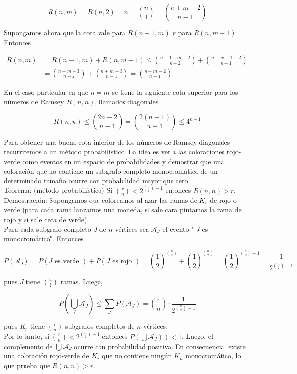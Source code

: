 \documentclass[10pt]{article}
\begin{document}
$$
R(n, m)=R(n, 2)=n=\binom{n}{1}=\binom{n+m-2}{n-1}
$$

Supongamos ahora que la cota vale para $R(n-1, m)$ y para $R(n, m-1)$. Entonces

$$
\begin{aligned}
R(n, m) & =R(n-1, m)+R(n, m-1) \leq\binom{ n-1+m-2}{n-2}+\binom{n+m-1-2}{n-1}= \\
& =\binom{n+m-3}{n-2}+\binom{n+m-3}{n-1}=\binom{n+m-2}{n-1}
\end{aligned}
$$

En el caso particular en que $n=m$ se tiene la siguiente cota superior para los números de Ramsey $R(n, n)$, llamados diagonales

$$
R(n, n) \leq\binom{ 2 n-2}{n-1}=\binom{2(n-1)}{n-1} \leq 4^{n-1}
$$

Para obtener una buena cota inferior de los números de Ramsey diagonales recurriremos a un método probabilístico. La idea es ver a las coloraciones rojo-verde como eventos en un espacio de probabilidades y demostrar que una coloración que no contiene un subgrafo completo monocromático de un determinado tamaño ocurre con probabilidad mayor que cero.\\
Teorema: (método probabilístico) Si $\binom{r}{n}<2^{\binom{n}{2}-1}$ entonces $R(n, n)>r$.\\
Demostración: Supongamos que coloreamos al azar las ramas de $K_{r}$ de rojo o verde (para cada rama lanzamos una moneda, si sale cara pintamos la rama de rojo y si sale ceca de verde).\\
Para cada subgrafo completo $J$ de $n$ vértices sea $\mathcal{A}_{J}$ el evento " $J$ es monocromático". Entonces

$$
P\left(\mathcal{A}_{J}\right)=P(J \text { es verde })+P(J \text { es rojo })=\left(\frac{1}{2}\right)^{\binom{n}{2}}+\left(\frac{1}{2}\right)^{\binom{n}{2}}=\left(\frac{1}{2}\right)^{\binom{n}{2}-1}=\frac{1}{2^{\binom{n}{2}-1}}
$$

pues $J$ tiene $\binom{n}{2}$ ramas. Luego,

$$
P\left(\bigcup_{J} \mathcal{A}_{J}\right) \leq \sum_{J} P\left(\mathcal{A}_{J}\right)=\binom{r}{n} \cdot \frac{1}{2^{\binom{n}{2}-1}}
$$

pues $K_{r}$ tiene $\binom{r}{n}$ subgrafos completos de $n$ vértices.\\
Por lo tanto, si $\binom{r}{n}<2^{\binom{n}{2}-1}$ entonces $\left.P\left(\bigcup \mathcal{A}_{J}\right)\right)<1$. Luego, el complemento de $\bigcup \mathcal{A}_{J}$ ocurre con probabilidad positiva. En consecuencia, existe una coloración rojo-verde de $K_{r}$ que no contiene ningún $K_{n}$ monocromático, lo que prueba que $R(n, n)>r$. $\square$
\end{document}

